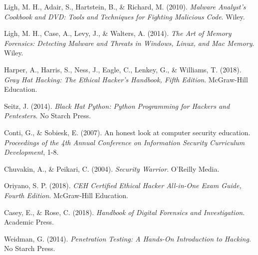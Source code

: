 \documentclass[12pt,a4paper]{article}
\begin{document}
\begin{thebibliography}{9}

Ligh, M. H., Adair, S., Hartstein, B., \& Richard, M. (2010). 
\textit{Malware Analyst's Cookbook and DVD: Tools and Techniques for Fighting Malicious Code}. 
Wiley.

Ligh, M. H., Case, A., Levy, J., \& Walters, A. (2014). 
\textit{The Art of Memory Forensics: Detecting Malware and Threats in Windows, Linux, and Mac Memory}. 
Wiley.

Harper, A., Harris, S., Ness, J., Eagle, C., Lenkey, G., \& Williams, T. (2018). 
\textit{Gray Hat Hacking: The Ethical Hacker's Handbook, Fifth Edition}. 
McGraw-Hill Education.

Seitz, J. (2014). 
\textit{Black Hat Python: Python Programming for Hackers and Pentesters}. 
No Starch Press.

Conti, G., \& Sobiesk, E. (2007). 
An honest look at computer security education. 
\textit{Proceedings of the 4th Annual Conference on Information Security Curriculum Development}, 1-8.

Chuvakin, A., \& Peikari, C. (2004). 
\textit{Security Warrior}. 
O'Reilly Media.

Oriyano, S. P. (2018). 
\textit{CEH Certified Ethical Hacker All-in-One Exam Guide, Fourth Edition}. 
McGraw-Hill Education.

Casey, E., \& Rose, C. (2018). 
\textit{Handbook of Digital Forensics and Investigation}. 
Academic Press.

Weidman, G. (2014). 
\textit{Penetration Testing: A Hands-On Introduction to Hacking}. 
No Starch Press.

\end{thebibliography}
\end{document}
